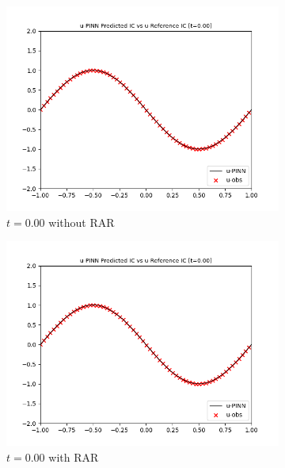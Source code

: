 \documentclass[letterpaper,11pt]{article}
\begin{document}
    \begin{figure}[h]
        \centering
        \begin{subfigure}{0.45\textwidth}
            \includegraphics*[width=\textwidth]{burgers_forward_t0.00.png}
            \caption{$t = 0.00$ without RAR}
            \label{burgers_forward_t0}
        \end{subfigure}
        \hfill
        \begin{subfigure}{0.45\textwidth}
            \includegraphics*[width=\textwidth]{burgers_forward_t0.00_rar.png}
            \caption{$t = 0.00$ with RAR}
            \label{burgers_forward_t0_rar}
        \end{subfigure}
        \begin{subfigure}{0.45\textwidth}

\end{subfigure}
\end{figure}
\end{document}
